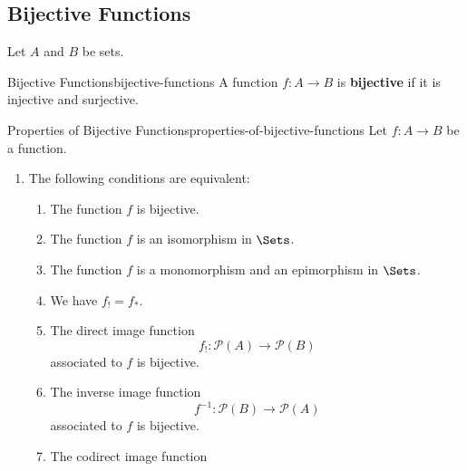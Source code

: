 \subsection{Bijective Functions}\label{subsection-bijective-functions}
Let $A$ and $B$ be sets.
\begin{definition}{Bijective Functions}{bijective-functions}%
    A function $f\colon A\to B$ is \textbf{bijective} if it is injective and surjective.
\end{definition}
\begin{proposition}{Properties of Bijective Functions}{properties-of-bijective-functions}%
    Let $f\colon A\to B$ be a function.
    \begin{enumerate}
        \item\label{properties-of-bijective-functions-characterisations}The following conditions are equivalent:
            \begin{enumerate}
                \item\label{properties-of-bijective-functions-characterisations-1}The function $f$ is bijective.
                \item\label{properties-of-bijective-functions-characterisations-2}The function $f$ is an isomorphism in $\Sets$.
                \item\label{properties-of-bijective-functions-characterisations-3}The function $f$ is a monomorphism and an epimorphism in $\Sets$.
                \item\label{properties-of-bijective-functions-characterisations-4}We have $f_{!}=f_{*}$.
                \item\label{properties-of-bijective-functions-characterisations-5}The direct image function
                    \[
                        f_{!}%
                        \colon%
                        \mathcal{P}(A)%
                        \to%
                        \mathcal{P}(B)%
                    \]%
                    associated to $f$ is bijective.
                \item\label{properties-of-bijective-functions-characterisations-6}The inverse image function
                    \[
                        f^{-1}%
                        \colon%
                        \mathcal{P}(B)%
                        \to%
                        \mathcal{P}(A)%
                    \]%
                    associated to $f$ is bijective.
                \item\label{properties-of-bijective-functions-characterisations-7}The codirect image function

\end{enumerate}
\end{enumerate}
\end{proposition}

